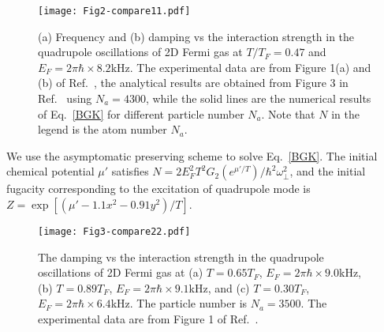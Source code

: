 \begin{figure}[t]
	\centering
	\texttt{[image: Fig2-compare11.pdf]}
	\caption[(a) Frequency and (b) damping vs the interaction strength in the quadrupole oscillations of 2D Fermi gas at $T/T_F=0.47$ and $E_F=2\pi\hbar\times8.2$kHz.]{  (a) Frequency and (b) damping vs the interaction strength in the quadrupole oscillations of 2D Fermi gas at $T/T_F=0.47$ and $E_F=2\pi\hbar\times8.2$kHz. The experimental data are from Figure 1(a) and (b) of Ref.~\cite{Vogt2012}, the analytical results are obtained from Figure 3 in Ref.~\cite{bruun_2012} using $N_a=4300$, while the solid lines are the numerical results of Eq.~\eqref{BGK} for different particle number $N_a$. Note that $N$ in the legend is the atom number $N_a$.}
	\label{fig2}
\end{figure}


We use the asymptomatic preserving scheme to solve Eq.~\eqref{BGK}. The initial chemical potential $\mu'$ satisfies $N={2E_F^2}T^2G_2(e^{\mu'/T})/{\hbar^2\omega_\bot^2}$, and the initial fugacity corresponding to the excitation of quadrupole mode is $Z=\exp[(\mu'-1.1x^2-0.91y^2)/T]$.

\begin{figure}[tb]
	\centering
	\texttt{[image: Fig3-compare22.pdf]}
	\caption[The damping vs the interaction strength in the quadrupole oscillations of 2D Fermi gas at (a) $T=0.65T_F$, $E_F=2\pi\hbar\times9.0$kHz, (b) $T=0.89T_F$, $E_F=2\pi\hbar\times9.1$kHz, and (c) $T=0.30T_F$, $E_F=2\pi\hbar\times6.4$kHz.]
	{The damping vs the interaction strength in the quadrupole oscillations of 2D Fermi gas at (a) $T=0.65T_F$, $E_F=2\pi\hbar\times9.0$kHz, (b) $T=0.89T_F$, $E_F=2\pi\hbar\times9.1$kHz, and (c) $T=0.30T_F$, $E_F=2\pi\hbar\times6.4$kHz. The particle number is $N_a=3500$. The experimental data are from Figure 1 of Ref.~\cite{Vogt2012}.
 }
	\label{fig3}
\end{figure}


